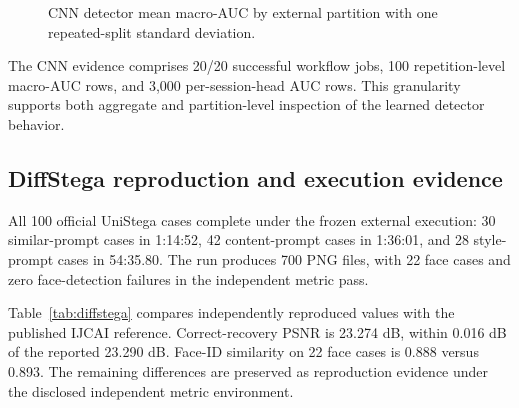 \begin{figure}[t]
\centering
{}
\caption{CNN detector mean macro-AUC by external partition with one repeated-split standard deviation.}
\label{fig:cnn-seeds}
\end{figure}

The CNN evidence comprises 20/20 successful workflow jobs, 100 repetition-level macro-AUC rows, and 3,000 per-session-head AUC rows. This granularity supports both aggregate and partition-level inspection of the learned detector behavior.

\subsection{DiffStega reproduction and execution evidence}

All 100 official UniStega cases complete under the frozen external execution: 30 similar-prompt cases in 1:14:52, 42 content-prompt cases in 1:36:01, and 28 style-prompt cases in 54:35.80. The run produces 700 PNG files, with 22 face cases and zero face-detection failures in the independent metric pass.

Table~\ref{tab:diffstega} compares independently reproduced values with the published IJCAI reference. Correct-recovery PSNR is 23.274 dB, within 0.016 dB of the reported 23.290 dB. Face-ID similarity on 22 face cases is 0.888 versus 0.893. The remaining differences are preserved as reproduction evidence under the disclosed independent metric environment.

